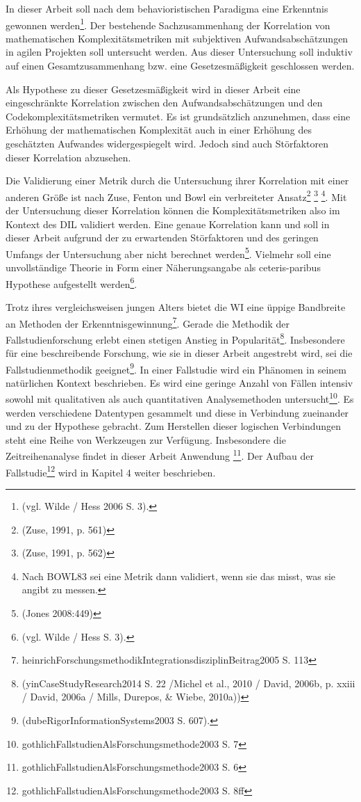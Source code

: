 In dieser Arbeit soll nach dem behavioristischen Paradigma eine
Erkenntnis gewonnen werden\footnote{(vgl. Wilde / Hess 2006 S. 3).}. Der
bestehende Sachzusammenhang der Korrelation von mathematischen
Komplexitätsmetriken mit subjektiven Aufwandsabschätzungen in agilen
Projekten soll untersucht werden. Aus dieser Untersuchung soll induktiv
auf einen Gesamtzusammenhang bzw. eine Gesetzesmäßigkeit geschlossen
werden.

Als Hypothese zu dieser Gesetzesmäßigkeit wird in dieser Arbeit eine
eingeschränkte Korrelation zwischen den Aufwandsabschätzungen und den
Codekomplexitätsmetriken vermutet. Es ist grundsätzlich anzunehmen, dass
eine Erhöhung der mathematischen Komplexität auch in einer Erhöhung des
geschätzten Aufwandes widergespiegelt wird. Jedoch sind auch
Störfaktoren dieser Korrelation abzusehen.

Die Validierung einer Metrik durch die Untersuchung ihrer Korrelation
mit einer anderen Größe ist nach Zuse, Fenton und Bowl ein verbreiteter
Ansatz\footnote{(Zuse, 1991, p. 561)} \footnote{(Zuse, 1991, p. 562)}
\footnote{Nach BOWL83 sei eine Metrik dann validiert, wenn sie das
misst, was sie angibt zu messen.}. Mit der Untersuchung dieser
Korrelation können die Komplexitätsmetriken also im Kontext des DIL
validiert werden. Eine genaue Korrelation kann und soll in dieser Arbeit
aufgrund der zu erwartenden Störfaktoren und des geringen Umfangs der
Untersuchung aber nicht berechnet werden\footnote{(Jones 2008:449)}.
Vielmehr soll eine unvollständige Theorie in Form einer Näherungsangabe
als ceteris-paribus Hypothese aufgestellt werden\footnote{(vgl. Wilde /
Hess S. 3).}.

Trotz ihres vergleichsweisen jungen Alters bietet die WI eine üppige
Bandbreite an Methoden der Erkenntnisgewinnung\footnote{heinrichForschungsmethodikIntegrationsdisziplinBeitrag2005
S. 113}. Gerade die Methodik der Fallstudienforschung erlebt einen
stetigen Anstieg in Popularität\footnote{(yinCaseStudyResearch2014 S. 22
/Michel et al., 2010 / David, 2006b, p. xxiii / David, 2006a / Mills,
Durepos, \& Wiebe, 2010a))}. Insbesondere für eine beschreibende
Forschung, wie sie in dieser Arbeit angestrebt wird, sei die
Fallstudienmethodik geeignet\footnote{(dubeRigorInformationSystems2003
S. 607).}. In einer Fallstudie wird ein Phänomen in seinem natürlichen
Kontext beschrieben. Es wird eine geringe Anzahl von Fällen intensiv
sowohl mit qualitativen als auch quantitativen Analysemethoden
untersucht\footnote{gothlichFallstudienAlsForschungsmethode2003 S. 7}.
Es werden verschiedene Datentypen gesammelt und diese in Verbindung
zueinander und zu der Hypothese gebracht. Zum Herstellen dieser
logischen Verbindungen steht eine Reihe von Werkzeugen zur Verfügung.
Insbesondere die Zeitreihenanalyse findet in dieser Arbeit Anwendung
\footnote{gothlichFallstudienAlsForschungsmethode2003 S. 6}. Der Aufbau
der Fallstudie\footnote{gothlichFallstudienAlsForschungsmethode2003 S.
8ff} wird in Kapitel 4 weiter beschrieben.

